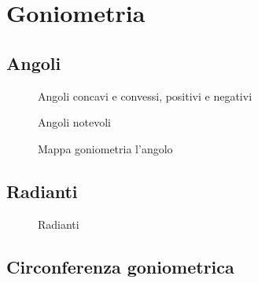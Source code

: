 \chapter{Goniometria}
\section{Angoli}
\begin{figure} %
	\centering
	
	\caption{Angoli concavi e convessi, positivi e negativi}
	\label{fig:angconconvposoneg}
	\end{figure}
	\begin{figure} %
		\centering
		
		\caption{Angoli notevoli}
		\label{fig:Angolorettoposneggonio}
		\end{figure}
		\begin{figure}
			
			\caption{Mappa goniometria l'angolo}
			\label{fig:MappaGonometria1}
		\end{figure}
\section{Radianti}
\begin{figure}
	\centering
	
	\caption{Radianti}
	\label{fig:radinatidefgonio}
\end{figure}
\section{Circonferenza goniometrica}
\begin{figure}
	\centering
	
	\label{fig:circonferenzagonimetricagonio}
\end{figure}
\begin{figure}
	\centering
	
	\label{fig:circonferenzagonimetricagonio2}
\end{figure}